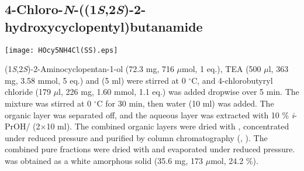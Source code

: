 \subsection{4\hyp{}Chloro\hyp{}\textit{N}\hyp{}((1\textit{S},2\textit{S})\hyp{}2\hyp{}hydroxycyclopentyl)butanamide }


\begin{scheme}[H]
	\begin{center}
		\texttt{[image: HOcy5NH4Cl(SS).eps]}
	\end{center}
\end{scheme}

(1\textit{S},2\textit{S})\hyp{}2\hyp{}Aminocyclopentan\hyp{}1\hyp{}ol  (72.3 mg, 716 $\mu$mol, 1 eq.), TEA (500 $\mu$l, 363 mg, 3.58 mmol, 5 eq.) and  (5 ml) were stirred at 0 $^\circ$C, and 4-chlorobutyryl chloride  (179 $\mu$l, 226 mg, 1.60 mmol, 1.1 eq.) was added dropwise over 5 min. The mixture was stirred at 0 $^\circ$C for 30 min, then water (10 ml) was added. The organic layer was separated off, and the aqueous layer was extracted with 10 \% \textit{i}-PrOH/ (2$\times$10 ml). The combined organic layers were dried with , concentrated under reduced pressure and purified by column chromatography (, ). The combined pure fractions were dried with  and evaporated under reduced pressure.  was obtained as a white amorphous solid (35.6 mg, 173 $\mu$mol, 24.2 \%).%
\\[1\baselineskip]
\\[1\baselineskip]
